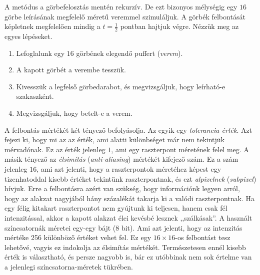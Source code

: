 \documentclass[12pt]{report}
\theoremstyle{definition}
\newcommand{\inenglish}[1]{\textsl{#1}}
\newcommand{\func}[1]{{\textsl{#1}}}
\begin{document}
A metódus a görbefelosztás mentén rekurzív. De ezt bizonyos mélységig egy $16$
görbe leírásának megfelelő méretű veremmel szimuláljuk. A görbék felbontását
 képletnek megfelelően mindig a $t=\frac{1}{2}$ pontban hajtjuk
végre. Nézzük meg az egyes lépéseket.
  \begin{enumerate}
    \item Lefoglalunk egy $16$ görbének elegendő puffert (\emph{verem}).
    \item A kapott görbét a verembe tesszük.
    \item Kivesszük a legfelső görbedarabot, és megvizsgáljuk, hogy leírható-e
    szakaszként.
    \item Megvizsgáljuk, hogy betelt-e a verem.
  \end{enumerate}

A felbontás mértékét két tényező befolyásolja. Az egyik egy \emph{tolerancia
érték}. Azt fejezi ki, hogy mi az az érték, ami alatti különbséget már nem
tekintjük mérvadónak. Ez az érték jelenleg $1$, ami egy raszterpont méretének
felel meg. A másik tényező az \emph{élsimítás} (\inenglish{anti-aliasing})
mértékét kifejező szám. Ez a szám jelenleg $16$, ami azt jelenti, hogy a
raszterpontok méretéhez képest egy tizenhatoddal kisebb értéket tekintünk
raszterpontnak, és ezt \emph{alpixelnek} (\inenglish{subpixel}) hívjuk. Erre a
felbontásra azért van szükség, hogy információnk legyen arról, hogy az alakzat
nagyjából hány százalékát takarja ki a valódi raszterpontnak. Ha egy félig
kitakart raszterpontot nem gyújtunk ki teljesen, hanem csak fél intenzitással,
akkor a kapott alakzat élei kevésbé lesznek ,,szálkásak''. A használt
színcsatornák méretei egy-egy bájt ($8$ bit). Ami azt jelenti, hogy az
intenzitás mértéke 256 különböző értéket vehet fel. Ez egy $16\times16$-os
felbontást tesz lehetővé, vagyis ez indokolja az élsimítás mértékét.
Természetesen ennél kisebb érték is választható, és persze nagyobb is, bár ez
utóbbinak nem sok értelme van a jelenlegi színcsatorna-méretek tükrében.
\end{document}
